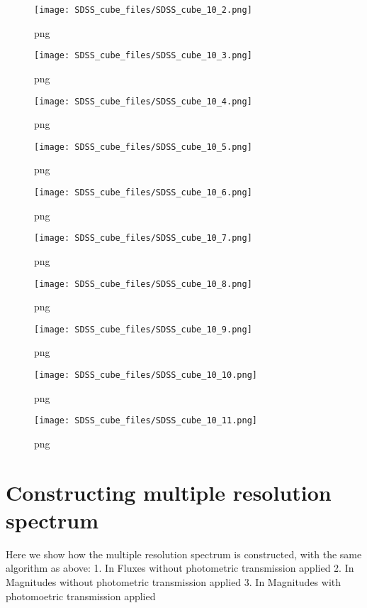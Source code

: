 \begin{figure}
\centering
\texttt{[image: SDSS\_cube\_files/SDSS\_cube\_10\_2.png]}
\caption{png}
\end{figure}

\begin{figure}
\centering
\texttt{[image: SDSS\_cube\_files/SDSS\_cube\_10\_3.png]}
\caption{png}
\end{figure}

\begin{figure}
\centering
\texttt{[image: SDSS\_cube\_files/SDSS\_cube\_10\_4.png]}
\caption{png}
\end{figure}

\begin{figure}
\centering
\texttt{[image: SDSS\_cube\_files/SDSS\_cube\_10\_5.png]}
\caption{png}
\end{figure}

\begin{figure}
\centering
\texttt{[image: SDSS\_cube\_files/SDSS\_cube\_10\_6.png]}
\caption{png}
\end{figure}

\begin{figure}
\centering
\texttt{[image: SDSS\_cube\_files/SDSS\_cube\_10\_7.png]}
\caption{png}
\end{figure}

\begin{figure}
\centering
\texttt{[image: SDSS\_cube\_files/SDSS\_cube\_10\_8.png]}
\caption{png}
\end{figure}

\begin{figure}
\centering
\texttt{[image: SDSS\_cube\_files/SDSS\_cube\_10\_9.png]}
\caption{png}
\end{figure}

\begin{figure}
\centering
\texttt{[image: SDSS\_cube\_files/SDSS\_cube\_10\_10.png]}
\caption{png}
\end{figure}

\begin{figure}
\centering
\texttt{[image: SDSS\_cube\_files/SDSS\_cube\_10\_11.png]}
\caption{png}
\end{figure}

\section{Constructing multiple resolution
spectrum}\label{constructing-multiple-resolution-spectrum}

Here we show how the multiple resolution spectrum is constructed, with
the same algorithm as above: 1. In Fluxes without photometric
transmission applied 2. In Magnitudes without photometric transmission
applied 3. In Magnitudes with photomoetric transmission applied

